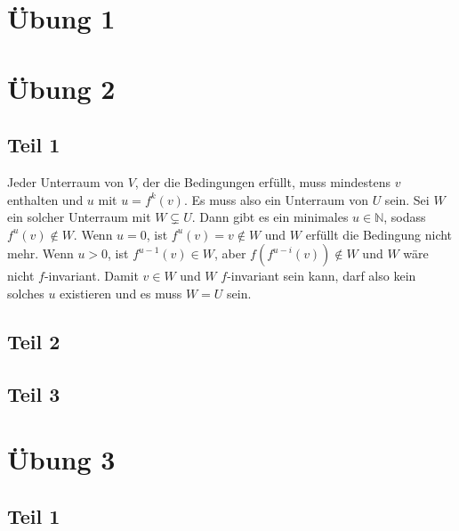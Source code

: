 \documentclass[10pt,a4paper]{article}
\begin{document}
\section*{Übung 1}

\section*{Übung 2}

\subsection*{Teil 1}

Jeder Unterraum von $V$, der die Bedingungen erfüllt, muss mindestens $v$ enthalten und $u$ mit $u = f^{k}(v)$.
Es muss also ein Unterraum von $U$ sein.
Sei $W$ ein solcher Unterraum mit $W \subsetneq U$.
Dann gibt es ein minimales $u \in \mathbb{N}$, sodass $f^{u}(v) \notin W$.
Wenn $u = 0$, ist $f^{u}(v) = v \notin W$ und $W$ erfüllt die Bedingung nicht mehr.
Wenn $u > 0$, ist $f^{u - 1}(v) \in W$, aber $f(f^{u - i}(v)) \notin W$ und $W$ wäre nicht $f$-invariant.
Damit $v \in W$ und $W$ $f$-invariant sein kann, darf also kein solches $u$ existieren und es muss $W = U$ sein.

\subsection*{Teil 2}

\subsection*{Teil 3}

\section*{Übung 3}

\subsection*{Teil 1}
\end{document}
